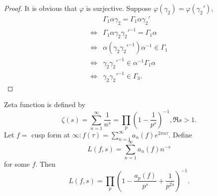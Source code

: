 \begin{proof}
  It is obvious that $\varphi$ is surjective. Suppose $\varphi(\gamma_2)=\varphi(\gamma_2')$,
  \begin{align*}
    & \Gamma_1\alpha \gamma_2=\Gamma_1\alpha \gamma_2'\\
    \Leftrightarrow&\Gamma_1\alpha\gamma_2\gamma_2'^{-1}=\Gamma_1\alpha\\
    \Leftrightarrow& \alpha(\gamma_2\gamma_2'^{-1})\alpha^{-1}\in \Gamma_1\\
    \Leftrightarrow&\gamma_2\gamma_2'^{-1}\in \alpha^{-1}\Gamma_1\alpha\\
    \Leftrightarrow&\gamma_2\gamma_2'^{-1}\in \Gamma_3
  .\end{align*}
\end{proof}

Zeta function is defined by
\[
  \zeta(s)=\sum_{n=1}^{\infty} \frac{1}{n^{s}}=\prod_{p}\left( 1-\frac{1}{p^{s}} \right) ^{-1}, \Re s>1.
\] 
Let $f=$ cusp form at $\infty:f(\tau )=\sum_{n=1}^{\infty} a_n(f)e^{2\pi n\tau }$. Define
\[
  L(f,s)=\sum_{n=1}^{\infty} a_n(f) n^{-s}
\] 
for some $f$. Then 
\[
  L(f,s)=\prod_{p}\left( 1- \frac{a_p(f)}{p^{s}}+\frac{1}{p^{2s}} \right) ^{-1}.
\] 
